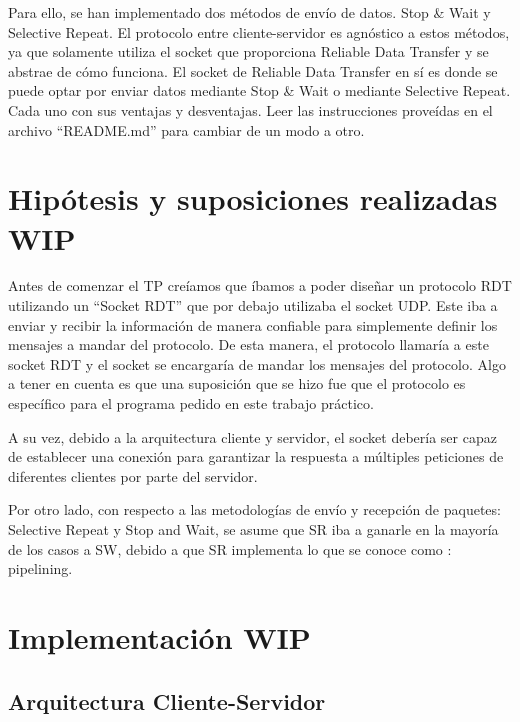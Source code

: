 \documentclass{article}
\begin{document}
Para ello, se han implementado dos métodos de envío de datos. Stop \& Wait y Selective Repeat. El protocolo entre cliente-servidor es agnóstico a estos métodos, ya que solamente utiliza el socket que proporciona Reliable Data Transfer y se abstrae de cómo funciona. El socket de Reliable Data Transfer en sí es donde se puede optar por enviar datos mediante Stop \& Wait o mediante Selective Repeat. Cada uno con sus ventajas y desventajas. Leer las instrucciones proveídas en el archivo ``README.md'' para cambiar de un modo a otro.

\section{\texorpdfstring{\textbf{Hipótesis y suposiciones realizadas
WIP}}{Hipótesis y suposiciones realizadas}}\label{hipuxf3tesis-y-suposiciones-realizadas-wip}

Antes de comenzar el TP creíamos que íbamos a poder diseñar un protocolo RDT utilizando un ``Socket RDT'' que por debajo utilizaba el socket UDP. Este iba a enviar y recibir la información de manera confiable para simplemente definir los mensajes a mandar del protocolo. De esta manera, el protocolo llamaría a este socket RDT y el socket se encargaría de mandar los mensajes del protocolo. Algo a tener en cuenta es que una suposición que se hizo fue que el protocolo es específico para el programa pedido en este trabajo práctico.

A su vez, debido a la arquitectura cliente y servidor, el socket debería ser capaz de establecer una conexión para garantizar la respuesta a múltiples peticiones de diferentes clientes por parte del servidor.

Por otro lado, con respecto a las metodologías de envío y recepción de paquetes: Selective Repeat y Stop and Wait, se asume que SR iba a ganarle en la mayoría de los casos a SW, debido a que SR implementa lo que se conoce como : pipelining.

\section{\texorpdfstring{\textbf{Implementación
WIP}}{Implementación}}\label{implementaciuxf3n-wip}

\subsection{Arquitectura Cliente-Servidor}\label{arquitectura-cliente-servidor}
\end{document}
